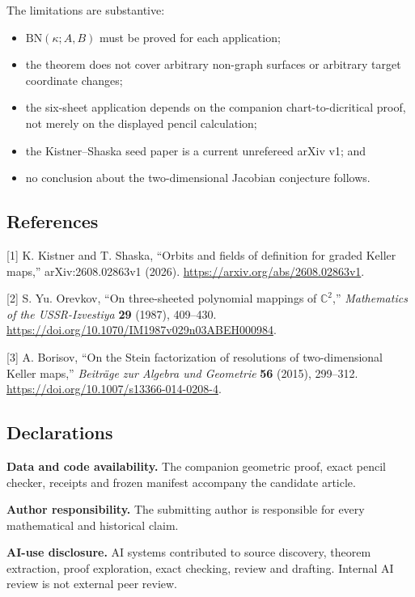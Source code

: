 \documentclass[
  11pt,
  a4paper,
]{article}
\providecommand{\tightlist}{%
  \setlength{\itemsep}{0pt}\setlength{\parskip}{0pt}}
\begin{document}
The limitations are substantive:

\begin{itemize}
\tightlist
\item
  \(\mathrm{BN}(\kappa;A,B)\) must be proved for each application;
\item
  the theorem does not cover arbitrary non-graph surfaces or arbitrary
  target coordinate changes;
\item
  the six-sheet application depends on the companion chart-to-dicritical
  proof, not merely on the displayed pencil calculation;
\item
  the Kistner--Shaska seed paper is a current unrefereed arXiv v1; and
\item
  no conclusion about the two-dimensional Jacobian conjecture follows.
\end{itemize}

\subsection{References}\label{references}

{[}1{]} K. Kistner and T. Shaska, ``Orbits and fields of definition for
graded Keller maps,'' arXiv:2608.02863v1 (2026).
\url{https://arxiv.org/abs/2608.02863v1}.

{[}2{]} S. Yu. Orevkov, ``On three-sheeted polynomial mappings of
\(\mathbb C^2\),'' \emph{Mathematics of the USSR-Izvestiya} \textbf{29}
(1987), 409--430. \url{https://doi.org/10.1070/IM1987v029n03ABEH000984}.

{[}3{]} A. Borisov, ``On the Stein factorization of resolutions of
two-dimensional Keller maps,'' \emph{Beiträge zur Algebra und Geometrie}
\textbf{56} (2015), 299--312.
\url{https://doi.org/10.1007/s13366-014-0208-4}.

\subsection{Declarations}\label{declarations}

\textbf{Data and code availability.} The companion geometric proof,
exact pencil checker, receipts and frozen manifest accompany the
candidate article.

\textbf{Author responsibility.} The submitting author is responsible for
every mathematical and historical claim.

\textbf{AI-use disclosure.} AI systems contributed to source discovery,
theorem extraction, proof exploration, exact checking, review and
drafting. Internal AI review is not external peer review.
\end{document}
